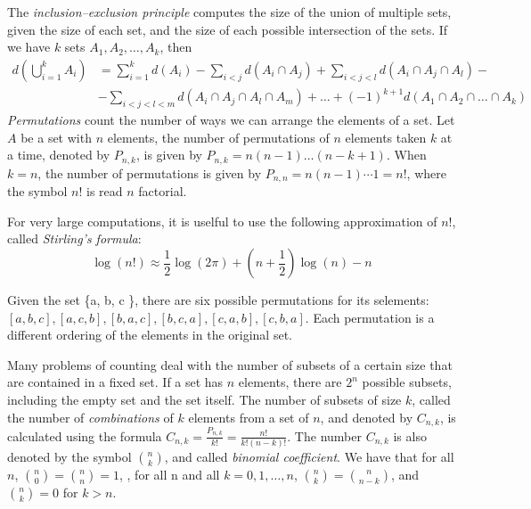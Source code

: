 The \emph{inclusion–exclusion principle} computes the size of the union of multiple sets, given the size of each set, and the size of each possible intersection of the sets. If we have $k$ sets $A_1, A_2, \ldots, A_k$, then 
\begin{equation*}
\begin{split}
d \left( \bigcup_{i=1}^k A_i \right) & = \sum_{i=1}^k d \left( A_i \right) - \sum_{i<j} d \left( A_i \cap A_j \right) + \sum_{i<j<l} d \left( A_i \cap A_j \cap A_l \right) - \\
& - \sum_{i<j<l<m} d \left( A_i \cap A_j \cap A_l \cap A_m \right) + \ldots +  (-1)^{k+1} d \left( A_1 \cap A_2 \cap \ldots \cap A_k \right) 
\end{split}
\end{equation*}
\emph{Permutations} count the number of ways we can arrange the elements of a set. Let $A$ be a set with $n$ elements, the number of permutations of $n$ elements taken $k$ at a time, denoted by $P_{n,k}$, is given by $P_{n,k} = n \left( n-1 \right) \ldots \left( n-k+1 \right)$. When $k=n$, the number of permutations is given by $P_{n,n} = n \left( n-1 \right) \cdots 1=n!$, where the symbol $n!$ is read $n$ factorial.

For very large computations, it is uselful to use the following approximation of $n!$, called \emph{Stirling's formula}:
\[
\log\left(n!\right) \approx \frac{1}{2}\log\left(2\pi\right)+\left(n+\frac{1}{2}\right)\log\left(n\right)-n
\]

\begin{example}
Given the set \{a, b, c \}, there are six possible permutations for its selements: $[a, b, c], [a, c, b], [b, a, c], [b, c, a], [c, a, b], [c, b, a]$. Each permutation is a different ordering of the elements in the original set.
\end{example}

Many problems of counting deal with the number of subsets of a certain size that are contained in a fixed set. If a set has $n$ elements, there are $2^n$ possible subsets, including the empty set and the set itself. The number of subsets of size $k$, called the number of \emph{combinations} of $k$ elements from a set of $n$, and denoted by $C_{n,k}$, is calculated using the formula $C_{n,k}=\frac{P_{n,k}}{k!}=\frac{n!}{k!\left(n-k\right)!}$. The number $C_{n,k}$ is also denoted by the symbol ${n \choose k}$, and called \emph{binomial coefficient}. We have that for all $n$, ${n \choose 0}={n \choose n}=1$, , for all n and all $k=0,1,\ldots,n$, ${n \choose k}={n \choose n-k}$, and ${n \choose k} = 0$ for $k>n$.

